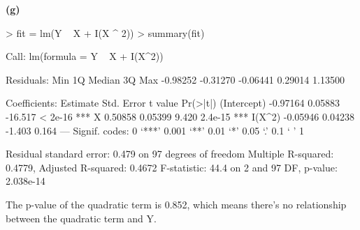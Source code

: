 \documentclass[a4paper]{article}
\renewcommand{\part}[1] {\vspace{.10in} {\bf (#1)}}
\begin{document}
\part{g}
\begin{Schunk}
\begin{Sinput}
> fit = lm(Y ~ X + I(X ^ 2))
> summary(fit)
\end{Sinput}
\begin{Soutput}
Call:
lm(formula = Y ~ X + I(X^2))

Residuals:
     Min       1Q   Median       3Q      Max 
-0.98252 -0.31270 -0.06441  0.29014  1.13500 

Coefficients:
            Estimate Std. Error t value Pr(>|t|)    
(Intercept) -0.97164    0.05883 -16.517  < 2e-16 ***
X            0.50858    0.05399   9.420  2.4e-15 ***
I(X^2)      -0.05946    0.04238  -1.403    0.164    
---
Signif. codes:  0 ‘***’ 0.001 ‘**’ 0.01 ‘*’ 0.05 ‘.’ 0.1 ‘ ’ 1

Residual standard error: 0.479 on 97 degrees of freedom
Multiple R-squared:  0.4779,	Adjusted R-squared:  0.4672 
F-statistic:  44.4 on 2 and 97 DF,  p-value: 2.038e-14
\end{Soutput}
\end{Schunk}
\begin{enumerate}
{\color{red}
\item The p-value of the quadratic term is 0.852, which means there's no relationship between the quadratic term and Y.
}
\end{enumerate}
\end{document}
